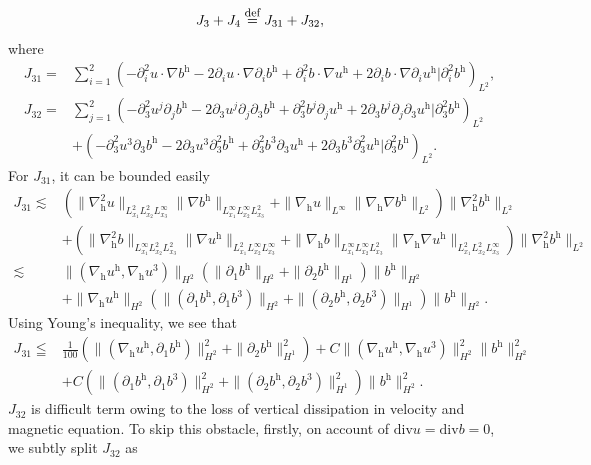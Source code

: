 \documentclass[11pt]{amsart}
\theoremstyle{definition}
\newcommand{\h}{\mathrm{h}}
\def\eqdefa{\buildrel\hbox{\footnotesize def}\over =}
\numberwithin{equation}{section}
\begin{document}
\begin{align}\label{J3,4deco}
	J_{3}+J_{4} \eqdefa J_{31}+J_{32} ,
\end{align}
where
\begin{align*}
	J_{31}=&\sum_{i=1}^2\left(-\partial_{i}^2u\cdot \nabla b^\h-2\partial_{i}u\cdot \nabla  \partial_{i}b^\h+\partial_{i}^2b\cdot \nabla u^\h+2\partial_{i}b\cdot \nabla  \partial_{i}u^\h|\partial_{i}^2b^\h\right)_{L^2},\\
	J_{32}=&\sum_{j=1}^2\left(-\partial_{3}^2u^j\partial_jb^\h-2\partial_{3}u^j\partial_j \partial_{3}b^\h+\partial_{3}^2b^j\partial_ju^\h+2\partial_{3}b^j\partial_j \partial_{3}u^\h|\partial_{3}^2b^\h\right)_{L^2}\\
	&+\left(-\partial_{3}^2u^3\partial_3b^\h-2\partial_{3}u^3\partial_3^2b^\h+\partial_{3}^2b^3\partial_3u^\h+2\partial_{3}b^3\partial_3^2u^\h|\partial_{3}^2b^\h\right)_{L^2}.
\end{align*}
For $J_{31}$, it can be bounded easily
\begin{align*}
	J_{31}\lesssim& \left(\|\nabla_\h^2 u\|_{L^2_{x_1}L^2_{x_2}L^\infty_{x_3}}\| \nabla b^\h \|_{L^\infty_{x_1}L^\infty_{x_2}L^2_{x_3}}+\|\nabla_\h u\|_{L^\infty}\|\nabla_\h\nabla b^\h\|_{L^2} \right)\|\nabla_\h^2 b^\h \| _{L^2}  \nonumber\\
	&+\left(\|\nabla_\h^2 b\|_{L^\infty_{x_1}L^2_{x_2}L^2_{x_3}}\| \nabla u^\h \|_{L^2_{x_1}L^\infty_{x_2}L^\infty_{x_3}}+\|\nabla_\h b\|_{L^\infty_{x_1}L^\infty_{x_2}L^2_{x_3}}\|\nabla_\h\nabla u^\h\|_{L^2_{x_1}L^2_{x_2}L^\infty_{x_3}} \right)\|\nabla_\h^2 b^\h \| _{L^2}\nonumber\\
	\lesssim&\|(\nabla_\h u^\h,\nabla_\h u^3)\|_{H^2}\left(\|\partial_1 b^\h\|_{H^2}+\|\partial_2 b^\h\|_{H^1}\right)\|b^\h\|_{H^2}\nonumber\\
	&+\|\nabla_\h u^\h\|_{H^2}\left(\|(\partial_1 b^\h,\partial_1b^3)\|_{H^2}+\|(\partial_2 b^\h,\partial_2b^3)\|_{H^1}\right)\|b^\h\|_{H^2}.
\end{align*}
Using Young's inequality, we see that
\begin{align}\label{J31}
	J_{31}\leqq& \frac{1}{100}\left(\|(\nabla_\h u^\h,\partial_1 b^\h)\|_{H^2}^2+\|\partial_2 b^\h\|_{H^1}^2\right)+C\|(\nabla_\h u^\h,\nabla_\h u^3)\|_{H^2}^2\|b^\h\|_{H^2}^2\nonumber\\
	&+C\left(\|(\partial_1 b^\h,\partial_1b^3)\|_{H^2}^2+\|(\partial_2 b^\h,\partial_2b^3)\|_{H^1}^2\right)\|b^\h\|_{H^2}^2.
\end{align}
$J_{32}$ is difficult term owing to the loss of vertical dissipation in velocity and magnetic equation. To skip this obstacle, firstly, on account of  $\mathrm{div}u=\mathrm{div}b=0$, we subtly split $J_{32}$ as
\end{document}
